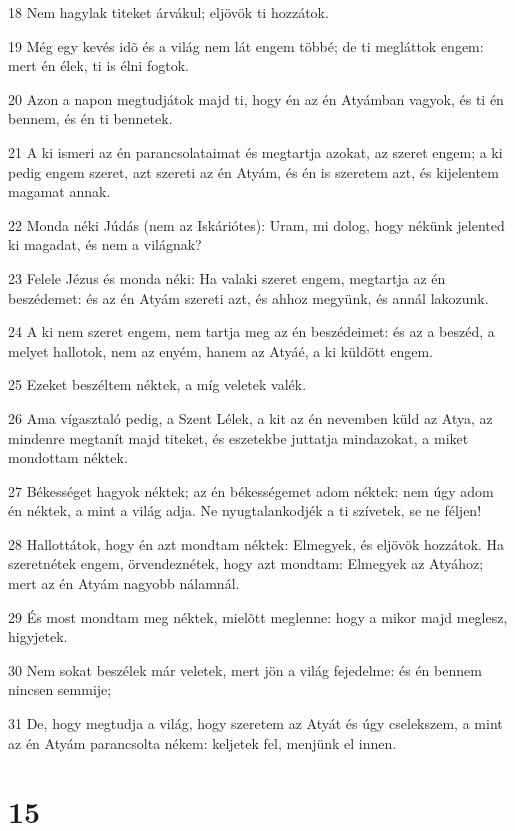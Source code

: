 \par 18 Nem hagylak titeket árvákul; eljövök ti hozzátok.
\par 19 Még egy kevés idõ és a világ nem lát engem többé; de ti megláttok engem: mert én élek, ti is élni fogtok.
\par 20 Azon a napon megtudjátok majd ti, hogy én az én Atyámban vagyok, és ti én bennem, és én ti bennetek.
\par 21 A ki ismeri az én parancsolataimat és megtartja azokat, az szeret engem; a ki pedig engem szeret, azt szereti az én Atyám, és én is szeretem azt, és kijelentem magamat annak.
\par 22 Monda néki Júdás (nem az Iskáriótes): Uram, mi dolog, hogy nékünk jelented ki magadat, és nem a világnak?
\par 23 Felele Jézus és monda néki: Ha valaki szeret engem, megtartja az én beszédemet: és az én Atyám szereti azt, és ahhoz megyünk, és annál lakozunk.
\par 24 A ki nem szeret engem, nem tartja meg az én beszédeimet: és az a beszéd, a melyet hallotok, nem az enyém, hanem az Atyáé, a ki küldött engem.
\par 25 Ezeket beszéltem néktek, a míg veletek valék.
\par 26 Ama vígasztaló pedig, a Szent Lélek, a kit az én nevemben küld az Atya, az mindenre megtanít majd titeket, és eszetekbe juttatja mindazokat, a miket mondottam néktek.
\par 27 Békességet hagyok néktek; az én békességemet adom néktek: nem úgy adom én néktek, a mint a világ adja. Ne nyugtalankodjék a ti szívetek, se ne féljen!
\par 28 Hallottátok, hogy én azt mondtam néktek: Elmegyek, és eljövök hozzátok. Ha szeretnétek engem, örvendeznétek, hogy azt mondtam: Elmegyek az Atyához; mert az én Atyám nagyobb nálamnál.
\par 29 És most mondtam meg néktek, mielõtt meglenne: hogy a mikor majd meglesz, higyjetek.
\par 30 Nem sokat beszélek már veletek, mert jön a világ fejedelme: és én bennem nincsen semmije;
\par 31 De, hogy megtudja a világ, hogy szeretem az Atyát és úgy cselekszem, a mint az én Atyám parancsolta nékem: keljetek fel, menjünk el innen.

\chapter{15}

